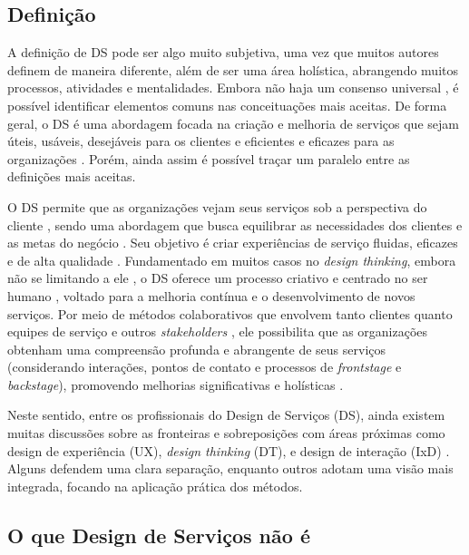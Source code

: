 \subsection{Definição}

A definição de DS pode ser algo muito subjetiva, uma vez que muitos autores definem de maneira diferente, além de ser uma área holística, abrangendo muitos processos, atividades e mentalidades. Embora não haja um consenso universal \cite{ZomerdijkVoss2010}, é possível identificar elementos comuns nas conceituações mais aceitas. De forma geral, o DS é uma abordagem focada na criação e melhoria de serviços que sejam úteis, usáveis, desejáveis para os clientes e eficientes e eficazes para as organizações \cite{Mager2009Emerging}. Porém, ainda assim é possível traçar um paralelo entre as definições mais aceitas.

O DS permite que as organizações vejam seus serviços sob a perspectiva do cliente \cite{Polaine2013Orange, Mager2009Emerging}, sendo uma abordagem que busca equilibrar as necessidades dos clientes e as metas do negócio \cite{Stickdorn2019, iriarte2023service}. Seu objetivo é criar experiências de serviço fluidas, eficazes e de alta qualidade \cite{Mager2009Emerging, Norman2016Applying}. Fundamentado em muitos casos no \textit{design thinking}, embora não se limitando a ele \cite{lee2022how}, o DS oferece um processo criativo e centrado no ser humano \cite{Norman2016Applying, mager2023product}, voltado para a melhoria contínua e o desenvolvimento de novos serviços. Por meio de métodos colaborativos que envolvem tanto clientes quanto equipes de serviço e outros \textit{stakeholders} \cite{milton2021eatingdisorders}, ele possibilita que as organizações obtenham uma compreensão profunda e abrangente de seus serviços (considerando interações, pontos de contato e processos de \textit{frontstage} e \textit{backstage}), promovendo melhorias significativas e holísticas \cite{Stickdorn2019, Tolle2024Vink}.

Neste sentido, entre os profissionais do Design de Serviços (DS), ainda existem muitas discussões sobre as fronteiras e sobreposições com áreas próximas como design de experiência (UX), \textit{design thinking} (DT), e design de interação (IxD) \cite{lee2022how}. Alguns defendem uma clara separação, enquanto outros adotam uma visão mais integrada, focando na aplicação prática dos métodos.

\subsection{O que Design de Serviços não é}

